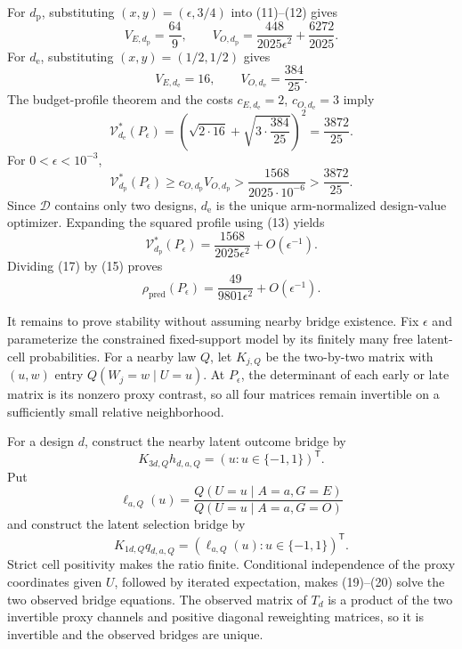 For \(d_{\mathrm p}\), substituting \((x,y)=(\epsilon,3/4)\) into (11)--(12) gives
\[
 V_{E,d_{\mathrm p}}=\frac{64}{9},
 \qquad
 V_{O,d_{\mathrm p}}
 =\frac{448}{2025\epsilon^2}+\frac{6272}{2025}. \tag{13}
\]
For \(d_{\mathrm e}\), substituting \((x,y)=(1/2,1/2)\) gives
\[
 V_{E,d_{\mathrm e}}=16,
 \qquad
 V_{O,d_{\mathrm e}}=\frac{384}{25}. \tag{14}
\]
The budget-profile theorem and the costs \(c_{E,d_{\mathrm e}}=2\), \(c_{O,d_{\mathrm e}}=3\) imply
\[
 \mathcal V_{d_{\mathrm e}}^*(P_\epsilon)
 =\left(\sqrt{2\cdot16}+\sqrt{3\cdot\frac{384}{25}}\right)^2
 =\frac{3872}{25}. \tag{15}
\]
For \(0<\epsilon<10^{-3}\),
\[
 \mathcal V_{d_{\mathrm p}}^*(P_\epsilon)
 \ge c_{O,d_{\mathrm p}}V_{O,d_{\mathrm p}}
 >\frac{1568}{2025\cdot10^{-6}}
 >\frac{3872}{25}. \tag{16}
\]
Since \(\mathcal D\) contains only two designs, \(d_{\mathrm e}\) is the unique arm-normalized design-value optimizer. Expanding the squared profile using (13) yields
\[
 \mathcal V_{d_{\mathrm p}}^*(P_\epsilon)
 =\frac{1568}{2025\epsilon^2}+O(\epsilon^{-1}). \tag{17}
\]
Dividing (17) by (15) proves
\[
 \rho_{\mathrm{pred}}(P_\epsilon)
 =\frac{49}{9801\epsilon^2}+O(\epsilon^{-1}). \tag{18}
\]

It remains to prove stability without assuming nearby bridge existence. Fix \(\epsilon\) and parameterize the constrained fixed-support model by its finitely many free latent-cell probabilities. For a nearby law \(Q\), let \(K_{j,Q}\) be the two-by-two matrix with \((u,w)\) entry \(Q(W_j=w\mid U=u)\). At \(P_\epsilon\), the determinant of each early or late matrix is its nonzero proxy contrast, so all four matrices remain invertible on a sufficiently small relative neighborhood.

For a design \(d\), construct the nearby latent outcome bridge by
\[
 K_{3d,Q}h_{d,a,Q}=(u:u\in\{-1,1\})^{\mathsf T}. \tag{19}
\]
Put
\[
 \ell_{a,Q}(u)=
 \frac{Q(U=u\mid A=a,G=E)}{Q(U=u\mid A=a,G=O)}
\]
and construct the latent selection bridge by
\[
 K_{1d,Q}q_{d,a,Q}=(\ell_{a,Q}(u):u\in\{-1,1\})^{\mathsf T}. \tag{20}
\]
Strict cell positivity makes the ratio finite. Conditional independence of the proxy coordinates given \(U\), followed by iterated expectation, makes (19)--(20) solve the two observed bridge equations. The observed matrix of \(T_d\) is a product of the two invertible proxy channels and positive diagonal reweighting matrices, so it is invertible and the observed bridges are unique.

